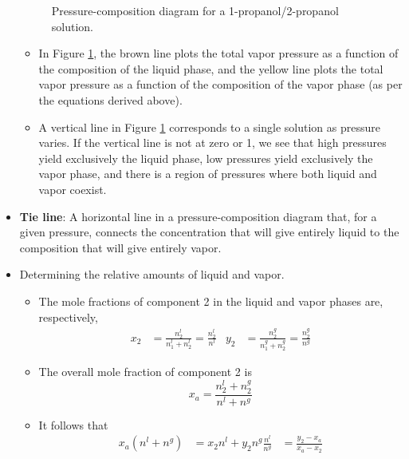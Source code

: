 \documentclass[../notes.tex]{subfiles}
\begin{document}
\begin{itemize}
\begin{figure}[H]
        \caption{Pressure-composition diagram for a 1-propanol/2-propanol solution.}
        \label{fig:PCdiagram}
    \end{figure}
    \begin{itemize}
        \item In Figure \ref{fig:PCdiagram}, the brown line plots the total vapor pressure as a function of the composition of the liquid phase, and the yellow line plots the total vapor pressure as a function of the composition of the vapor phase (as per the equations derived above).
        \item A vertical line in Figure \ref{fig:PCdiagram} corresponds to a single solution as pressure varies. If the vertical line is not at zero or 1, we see that high pressures yield exclusively the liquid phase, low pressures yield exclusively the vapor phase, and there is a region of pressures where both liquid and vapor coexist.
    \end{itemize}
    \item \textbf{Tie line}: A horizontal line in a pressure-composition diagram that, for a given pressure, connects the concentration that will give entirely liquid to the composition that will give entirely vapor.
    \item Determining the relative amounts of liquid and vapor.
    \begin{itemize}
        \item The mole fractions of component 2 in the liquid and vapor phases are, respectively,
        \begin{align*}
            x_2 &= \frac{n_2^l}{n_1^l+n_2^l} = \frac{n_2^l}{n^l}&
            y_2 &= \frac{n_2^g}{n_1^g+n_2^g} = \frac{n_2^g}{n^g}
        \end{align*}
        \item The overall mole fraction of component 2 is
        \begin{equation*}
            x_a = \frac{n_2^l+n_2^g}{n^l+n^g}
        \end{equation*}
        \item It follows that
        \begin{align*}
            x_a(n^l+n^g) &= x_2n^l+y_2n^g
            \frac{n^l}{n^g} &= \frac{y_2-x_a}{x_a-x_2}
        \end{align*}

\end{itemize}
\end{itemize}
\end{document}
